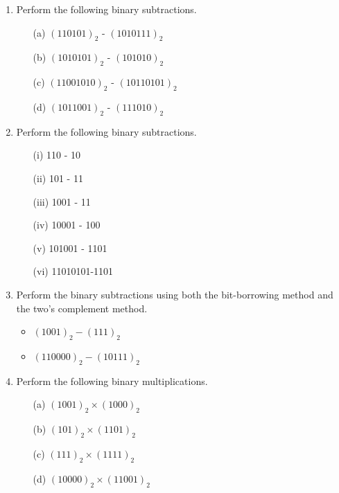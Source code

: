 \documentclass[]{report}
\begin{document}
\begin{enumerate}
\item 

Perform the following binary subtractions.
  \begin{multicols}{2}
    \begin{itemize}
    \item[(a)] $(110101)_{2}$ - $(1010111)_{2}$
    \item[(b)] $(1010101)_{2}$ - $(101010)_{2}$
    \item[(c)] $(11001010)_{2}$ - $(10110101)_{2}$
    \item[(d)] $(1011001)_{2}$ - $(111010)_{2}$
    \end{itemize}
  \end{multicols}

    


\item Perform the following binary subtractions.
\begin{multicols}{2}
	\begin{itemize}
		\item[(i)] 110 - 10	
		\item[(ii)] 101 - 11  
		\item[(iii)] 1001 - 11	
		\item[(iv)] 10001 - 100 
		\item[(v)] 101001 - 1101
		\item[(vi)] 11010101-1101
	\end{itemize}
\end{multicols}

\item 

Perform the binary subtractions using both the bit-borrowing method and the two's complement method.
\begin{itemize}
\item $(1001)_2 -(111)_2$
\item $(110000)_2 -(10111)_2$
\end{itemize}


\item Perform the following binary multiplications.
\begin{multicols}{2}
\begin{itemize}
\item[(a)] $(1001)_{2}\times( 1000)_{2}$  %
\item[(b)] $(101)_{2}\times(1101)_{2}$ %
\item[(c)] $(111)_{2}\times(1111)_{2}$ %
\item[(d)] $(10000)_{2}\times(11001)_{2}$    %
\end{itemize}
 \end{multicols}




\end{enumerate}
\end{document}
